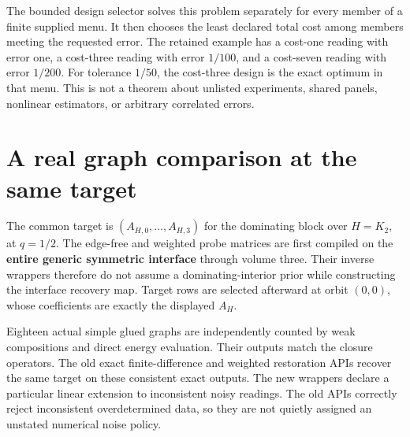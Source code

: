 \documentclass[
  11pt,
  a4paper,
]{report}
\begin{document}
The bounded design selector solves this problem separately for every
member of a finite supplied menu. It then chooses the least declared
total cost among members meeting the requested error. The retained
example has a cost-one reading with error one, a cost-three reading with
error \(1/100\), and a cost-seven reading with error \(1/200\). For
tolerance \(1/50\), the cost-three design is the exact optimum in that
menu. This is not a theorem about unlisted experiments, shared panels,
nonlinear estimators, or arbitrary correlated errors.

\hypertarget{a-real-graph-comparison-at-the-same-target}{%
\section{A real graph comparison at the same
target}\label{a-real-graph-comparison-at-the-same-target}}

The common target is \((A_{H,0},\ldots,A_{H,3})\) for the dominating
block over \(H=K_2\), at \(q=1/2\). The edge-free and weighted probe
matrices are first compiled on the \textbf{entire generic symmetric
interface} through volume three. Their inverse wrappers therefore do not
assume a dominating-interior prior while constructing the interface
recovery map. Target rows are selected afterward at orbit \((0,0)\),
whose coefficients are exactly the displayed \(A_H\).

Eighteen actual simple glued graphs are independently counted by weak
compositions and direct energy evaluation. Their outputs match the
closure operators. The old exact finite-difference and weighted
restoration APIs recover the same target on these consistent exact
outputs. The new wrappers declare a particular linear extension to
inconsistent noisy readings. The old APIs correctly reject inconsistent
overdetermined data, so they are not quietly assigned an unstated
numerical noise policy.
\end{document}
